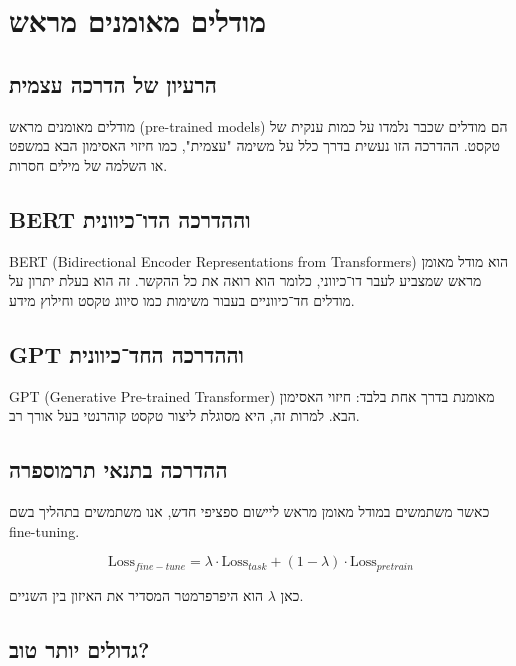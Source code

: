 \chapter{מודלים מאומנים מראש}

\section{הרעיון של הדרכה עצמית}

מודלים מאומנים מראש (\textenglish{pre-trained models}) הם מודלים שכבר נלמדו על כמות ענקית של טקסט.
ההדרכה הזו נעשית בדרך כלל על משימה "עצמית", כמו חיזוי האסימון הבא במשפט או השלמה של מילים חסרות.

\section{\textenglish{BERT} וההדרכה הדו־כיוונית}

\textenglish{BERT} (Bidirectional Encoder Representations from \textenglish{Transformers})
הוא מודל מאומן מראש שמצביע לעבר דו־כיווני, כלומר הוא רואה את כל ההקשר.
זה הוא בעלת יתרון על מודלים חד־כיווניים בעבור משימות כמו סיווג טקסט וחילוץ מידע.

\section{\textenglish{GPT} וההדרכה החד־כיוונית}

\textenglish{GPT} (\textenglish{Generative Pre-trained Transformer})
מאומנת בדרך אחת בלבד: חיזוי האסימון הבא.
למרות זה, היא מסוגלת ליצור טקסט קוהרנטי בעל אורך רב.

\section{ההדרכה בתנאי תרמוספרה}

כאשר משתמשים במודל מאומן מראש ליישום ספציפי חדש, אנו משתמשים בתהליך בשם \textenglish{fine-tuning}.

\begin{equation}
\text{Loss}_{fine-tune} = \lambda \cdot \text{Loss}_{task} + (1 - \lambda) \cdot \text{Loss}_{pretrain}
\end{equation}

כאן \(\lambda\) הוא היפרפרמטר המסדיר את האיזון בין השניים.

\section{גדולים יותר טוב?}

